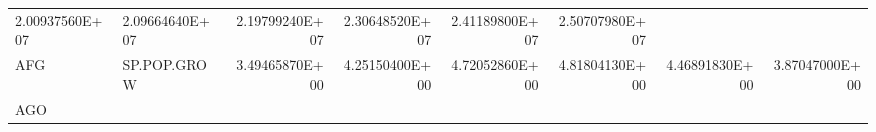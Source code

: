 \documentclass[]{article}
\begin{document}
\begin{longtable}[]{@{}llrrrrrr@{}}
\begin{minipage}[t]{0.11\columnwidth}
2.00937560E+07\strut
\end{minipage} & \begin{minipage}[t]{0.11\columnwidth}\raggedleft\strut
2.09664640E+07\strut
\end{minipage} & \begin{minipage}[t]{0.11\columnwidth}\raggedleft\strut
2.19799240E+07\strut
\end{minipage} & \begin{minipage}[t]{0.11\columnwidth}\raggedleft\strut
2.30648520E+07\strut
\end{minipage} & \begin{minipage}[t]{0.11\columnwidth}\raggedleft\strut
2.41189800E+07\strut
\end{minipage} & \begin{minipage}[t]{0.11\columnwidth}\raggedleft\strut
2.50707980E+07\strut
\end{minipage}\tabularnewline
\begin{minipage}[t]{0.06\columnwidth}\raggedright\strut
AFG\strut
\end{minipage} & \begin{minipage}[t]{0.08\columnwidth}\raggedright\strut
SP.POP.GROW\strut
\end{minipage} & \begin{minipage}[t]{0.11\columnwidth}\raggedleft\strut
3.49465870E+00\strut
\end{minipage} & \begin{minipage}[t]{0.11\columnwidth}\raggedleft\strut
4.25150400E+00\strut
\end{minipage} & \begin{minipage}[t]{0.11\columnwidth}\raggedleft\strut
4.72052860E+00\strut
\end{minipage} & \begin{minipage}[t]{0.11\columnwidth}\raggedleft\strut
4.81804130E+00\strut
\end{minipage} & \begin{minipage}[t]{0.11\columnwidth}\raggedleft\strut
4.46891830E+00\strut
\end{minipage} & \begin{minipage}[t]{0.11\columnwidth}\raggedleft\strut
3.87047000E+00\strut
\end{minipage}\tabularnewline
\begin{minipage}[t]{0.06\columnwidth}\raggedright\strut
AGO\strut
\end{minipage} & \begin{minipage}[t]{0.08\columnwidth}\raggedright\strut

\end{minipage}
\end{longtable}
\end{document}
